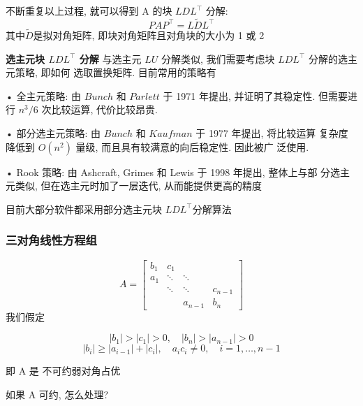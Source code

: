 \documentclass[12pt,a4paper]{article}
\begin{document}
不断重复以上过程, 就可以得到 A 的块 $LDL^{\top}$ 分解:
\begin{equation}
P A P^{\top}=L \tilde{D} L^{\top}
\end{equation}
其中$\tilde{D}$是拟对角矩阵, 即块对角矩阵且对角块的大小为 1 或 2

{\bfseries 选主元块 $LDL^{\top}$ 分解}
与选主元 $LU$ 分解类似, 我们需要考虑块 $LDL^{\top}$ 分解的选主元策略, 即如何
选取置换矩阵. 目前常用的策略有

• 全主元策略: 由 $Bunch$ 和 $Parlett$ 于 1971 年提出, 并证明了其稳定性.
但需要进行 $n^3/6$ 次比较运算, 代价比较昂贵.

• 部分选主元策略: 由 $Bunch$ 和 $Kaufman$ 于 1977 年提出, 将比较运算
复杂度降低到 $O(n^2)$ 量级, 而且具有较满意的向后稳定性. 因此被广
泛使用.

• Rook 策略: 由 Ashcraft, Grimes 和 Lewis 于 1998 年提出, 整体上与部
分选主元类似, 但在选主元时加了一层迭代, 从而能提供更高的精度

\begin{framed}
	目前大部分软件都采用部分选主元块 $LDL^{\top}$分解算法
\end{framed}

\subsubsection{三对角线性方程组}
\begin{equation}
A=\left[\begin{array}{cccc}{b_{1}} & {c_{1}} & {} & {} \\ {a_{1}} & {\ddots} & {\ddots} & {} \\ {} & {\ddots} & {\ddots} & {c_{n-1}} \\ {} & {} & {a_{n-1}} & {b_{n}}\end{array}\right]
\end{equation}
我们假定

\begin{equation}
\left|b_{1}\right|>\left|c_{1}\right|>0, \quad\left|b_{n}\right|>\left|a_{n-1}\right|>0
\end{equation}
\begin{equation}
\left|b_{i}\right| \geq\left|a_{i-1}\right|+\left|c_{i}\right|, \quad a_{i} c_{i} \neq 0, \quad i=1, \ldots, n-1
\end{equation}

即 A 是 不可约弱对角占优


如果 A 可约, 怎么处理?
\end{document}
